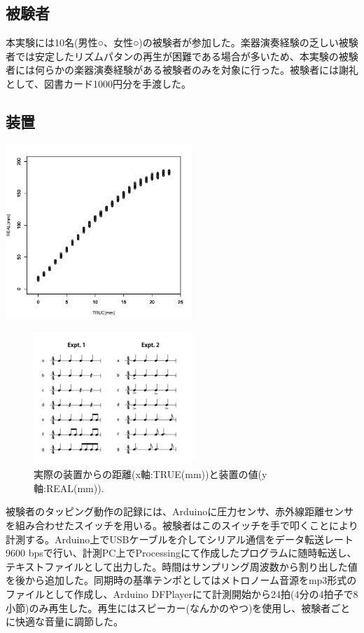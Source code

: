 \documentclass[twocolumn,10pt]{jarticle}
\begin{document}
\subsection{被験者}
本実験には10名(男性○、女性○)の被験者が参加した。楽器演奏経験の乏しい被験者では安定したリズムパタンの再生が困難である場合が多いため、本実験の被験者には何らかの楽器演奏経験がある被験者のみを対象に行った。被験者には謝礼として、図書カード1000円分を手渡した。

\subsection{装置}

\begin{center}
  \includegraphics[width=7cm]{distans_true.jpg}
  \begin{figure}
    \centering
    \includegraphics[width=6cm]{Nagasima.jpg}
    \caption{実際の装置からの距離(x軸:TRUE(mm))と装置の値(y軸:REAL(mm)).}
    \label{Nagasima}
  \end{figure}
\end{center}	
被験者のタッピング動作の記録には、Arduinoに圧力センサ、赤外線距離センサを組み合わせたスイッチを用いる。被験者はこのスイッチを手で叩くことにより計測する。Arduino上でUSBケーブルを介してシリアル通信をデータ転送レート9600 bpsで行い、計測PC上でProcessingにて作成したプログラムに随時転送し、テキストファイルとして出力した。時間はサンプリング周波数から割り出した値を後から追加した。同期時の基準テンポとしてはメトロノーム音源をmp3形式のファイルとして作成し、Arduino DFPlayerにて計測開始から24拍(4分の4拍子で8小節)のみ再生した。再生にはスピーカー(なんかのやつ)を使用し、被験者ごとに快適な音量に調節した。
\end{document}
